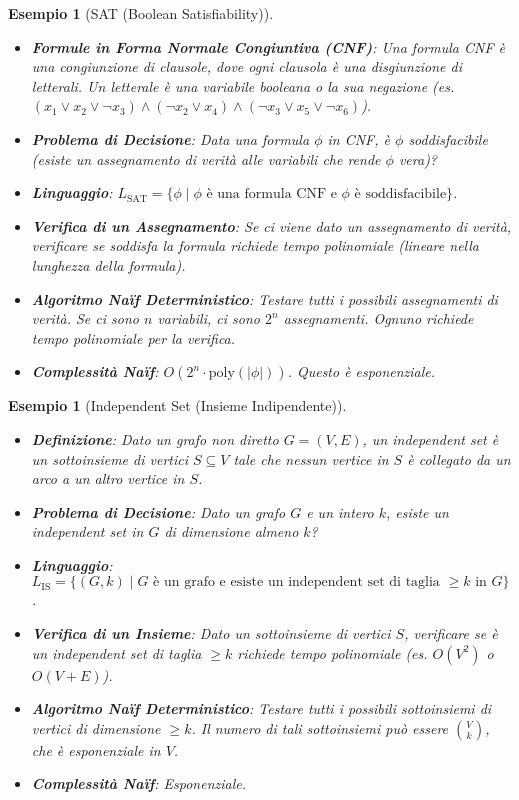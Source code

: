 \documentclass[a4paper, 11pt]{book} %
\newtheorem{example}[theorem]{Esempio}
\theoremstyle{definition}
\begin{document}
\begin{example}[SAT (Boolean Satisfiability)]
\begin{itemize}
    \item \textbf{Formule in Forma Normale Congiuntiva (CNF)}: Una formula CNF è una congiunzione di clausole, dove ogni clausola è una disgiunzione di letterali. Un letterale è una variabile booleana o la sua negazione (es. $(x_1 \lor x_2 \lor \neg x_3) \land (\neg x_2 \lor x_4) \land (\neg x_3 \lor x_5 \lor \neg x_6)$).
    \item \textbf{Problema di Decisione}: Data una formula $\phi$ in CNF, è $\phi$ soddisfacibile (esiste un assegnamento di verità alle variabili che rende $\phi$ vera)?
    \item \textbf{Linguaggio}: $L_{\text{SAT}} = \{ \phi \mid \phi \text{ è una formula CNF e } \phi \text{ è soddisfacibile} \}$.
    \item \textbf{Verifica di un Assegnamento}: Se ci viene dato un assegnamento di verità, verificare se soddisfa la formula richiede tempo polinomiale (lineare nella lunghezza della formula).
    \item \textbf{Algoritmo Naïf Deterministico}: Testare tutti i possibili assegnamenti di verità. Se ci sono $n$ variabili, ci sono $2^n$ assegnamenti. Ognuno richiede tempo polinomiale per la verifica.
    \item \textbf{Complessità Naïf}: $O(2^n \cdot \text{poly}(|\phi|))$. Questo è esponenziale.
\end{itemize}
\end{example}

\begin{example}[Independent Set (Insieme Indipendente)]
\begin{itemize}
    \item \textbf{Definizione}: Dato un grafo non diretto $G=(V, E)$, un \emph{independent set} è un sottoinsieme di vertici $S \subseteq V$ tale che nessun vertice in $S$ è collegato da un arco a un altro vertice in $S$.
    \item \textbf{Problema di Decisione}: Dato un grafo $G$ e un intero $k$, esiste un independent set in $G$ di dimensione almeno $k$?
    \item \textbf{Linguaggio}: $L_{\text{IS}} = \{ (G, k) \mid G \text{ è un grafo e esiste un independent set di taglia } \ge k \text{ in } G \}$.
    \item \textbf{Verifica di un Insieme}: Dato un sottoinsieme di vertici $S$, verificare se è un independent set di taglia $\ge k$ richiede tempo polinomiale (es. $O(V^2)$ o $O(V+E)$).
    \item \textbf{Algoritmo Naïf Deterministico}: Testare tutti i possibili sottoinsiemi di vertici di dimensione $\ge k$. Il numero di tali sottoinsiemi può essere $\binom{V}{k}$, che è esponenziale in $V$.
    \item \textbf{Complessità Naïf}: Esponenziale.
\end{itemize}
\end{example}
\end{document}
